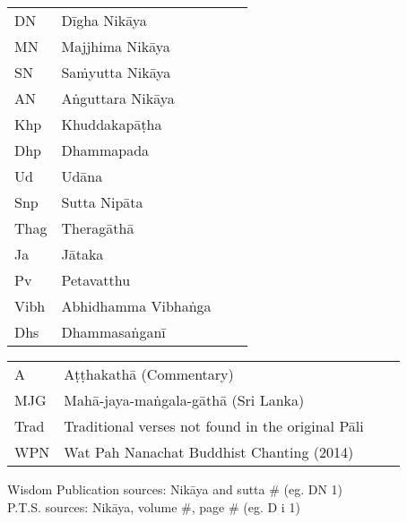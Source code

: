 \begin{tabular}{@{}llll@{}}
  DN    & Dīgha Nikāya                                        \\
  MN    & Majjhima Nikāya                                     \\
  SN    & Saṁyutta Nikāya                                     \\
  AN    & Aṅguttara Nikāya                                    \\
  Khp   & Khuddakapāṭha                                       \\
  Dhp   & Dhammapada                                          \\
  Ud    & Udāna                                               \\
  Snp   & Sutta Nipāta                                        \\
  Thag  & Theragāthā                                          \\
  Ja    & Jātaka                                              \\
  Pv    & Petavatthu                                          \\
  Vibh  & Abhidhamma Vibhaṅga                                 \\
  Dhs   & Dhammasaṅganī                                       \\
\end{tabular}

\begin{tabular}{@{}llll@{}}
  A     & Aṭṭhakathā (Commentary)                             \\
  MJG   & Mahā-jaya-maṅgala-gāthā (Sri Lanka)                 \\
  Trad  & Traditional verses not found in the original Pāli   \\
  WPN   & Wat Pah Nanachat Buddhist Chanting (2014)           \\
\end{tabular}

\medskip

Wisdom Publication sources: Nikāya and sutta \# (eg. DN 1)\\
P.T.S. sources: Nikāya, volume \#, page \# (eg. D i 1)
